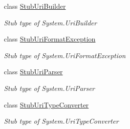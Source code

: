 \begin{DoxyCompactItemize}
class \hyperlink{class_system_1_1_fakes_1_1_stub_uri_builder}{Stub\-Uri\-Builder}
\begin{DoxyCompactList}\small\item\em Stub type of System.\-Uri\-Builder\end{DoxyCompactList}\item 
class \hyperlink{class_system_1_1_fakes_1_1_stub_uri_format_exception}{Stub\-Uri\-Format\-Exception}
\begin{DoxyCompactList}\small\item\em Stub type of System.\-Uri\-Format\-Exception\end{DoxyCompactList}\item 
class \hyperlink{class_system_1_1_fakes_1_1_stub_uri_parser}{Stub\-Uri\-Parser}
\begin{DoxyCompactList}\small\item\em Stub type of System.\-Uri\-Parser\end{DoxyCompactList}\item 
class \hyperlink{class_system_1_1_fakes_1_1_stub_uri_type_converter}{Stub\-Uri\-Type\-Converter}
\begin{DoxyCompactList}\small\item\em Stub type of System.\-Uri\-Type\-Converter\end{DoxyCompactList}\end{DoxyCompactItemize}
